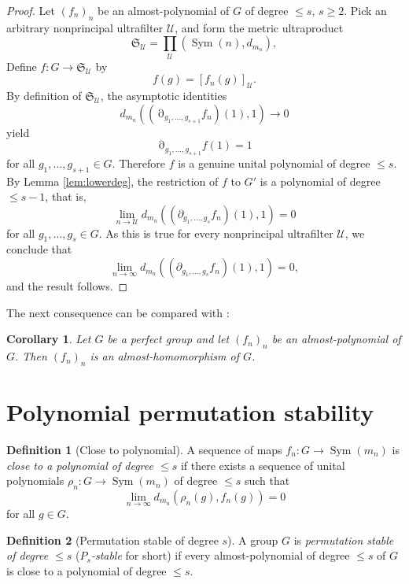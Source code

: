 \documentclass[a4paper,12pt]{amsart}
\theoremstyle{plain}
\newtheorem{corollary}[subsection]{{\bf Corollary}}
\theoremstyle{definition}
\newtheorem*{definition}{{\bf Definition}}
\theoremstyle{remark}
\numberwithin{equation}{subsection}
\DeclareMathOperator{\Sym}{Sym}
\DeclareMathOperator{\mypartial}{\partial}
\begin{document}
\begin{proof}
    Let $(f_n)_n$ be an almost-polynomial of $G$ of degree $\le s$, $s\ge 2$. Pick an arbitrary nonprincipal ultrafilter $\mathcal{U}$, and form the metric ultraproduct
    $$\mathfrak{S}_{\mathcal{U}}=\prod_{\mathcal{U}} (\Sym(n),d_{m_n}),$$
    Define $f:G\to\mathfrak{S}_{\mathcal{U}}$ by
    $$f(g)=[f_n(g)]_{\mathcal{U}}.$$ By definition of $\mathfrak{S}_{\mathcal{U}}$, the asymptotic identities 
    $$d_{m_n}((\mypartial_{g_1,\ldots ,g_{s+1}}f_n)(1),1)\to 0$$
     yield
    $$\mypartial_{g_1,\ldots ,g_{s+1}}f(1)=1$$
    for all $g_1,\ldots ,g_{s+1}\in G$. Therefore $f$ is a genuine unital polynomial of degree $\le s$.
     By Lemma \ref{lem:lowerdeg}, the restriction of $f$ to $G'$ is a polynomial of degree $\le s-1$, that is,
    $$\lim_{n\to\mathcal{U}}d_{m_n}
    ((\partial_{g_1,\dots,g_s}f_n)(1),1)=0$$
    for all $g_1,\ldots ,g_s\in G$.
    As this is true for every nonprincipal ultrafilter $\mathcal{U}$, we conclude that
    $$\lim_{n\to\infty}d_{m_n}
    ((\partial_{g_1,\dots,g_s}f_n)(1),1)=0,$$
    and the result follows.
\end{proof}

The next consequence can be compared with \cite[Theorem 5.5]{JT24}:
\begin{corollary}
    \label{cor:perfect}
    Let $G$ be a perfect group and let $(f_n)_n$ be an almost-polynomial of $G$. Then $(f_n)_n$ is an almost-homomorphism of $G$.
\end{corollary}


\section{Polynomial permutation stability}
\label{s:polystability}

\noindent

\begin{definition}[Close to polynomial]
    A sequence of maps $f_n:G\to\Sym(m_n)$ is \emph{close to a polynomial of degree $\le s$} if there exists a sequence of unital polynomials $\rho_n:G\to \Sym(m_n)$ of degree $\le s$ such that
    $$\lim_{n\to \infty} d_{m_n}(\rho_n(g),f_n(g))=0$$
for all $g\in G$.
\end{definition}


\begin{definition}[Permutation stable of degree $s$]
    A group $G$ is \emph{permutation stable of degree $\le s$} (\emph{$P_s$-stable} for short) if every almost-polynomial of degree $\le s$ of $G$ is close to a polynomial of degree $\le s$.
\end{definition}
\end{document}
